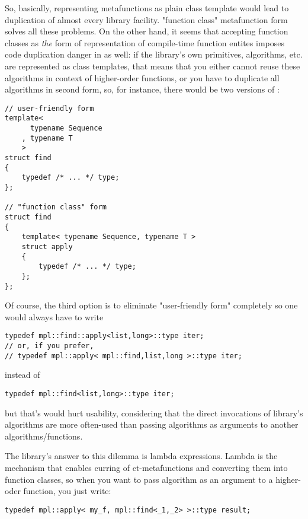 \documentclass{netobjectdays}
\begin{document}
So, basically, representing metafunctions as plain class 
template would lead to duplication of almost every library 
facility. "function class" metafunction form solves all these 
problems. On the other hand, it seems that accepting function 
classes as \emph{the} form of representation of compile-time 
function entites imposes code duplication danger in as well: 
if the library's own primitives, algorithms, etc. are 
represented as class templates, that means that you either 
cannot reuse these algorithms in context of higher-order 
functions, or you have to duplicate all algorithms in second 
form, so, for instance, there would be two versions of 
:

{\footnotesize
\begin{verbatim}
// user-friendly form
template<
      typename Sequence
    , typename T
    >
struct find
{
    typedef /* ... */ type;
};

// "function class" form
struct find
{
    template< typename Sequence, typename T >
    struct apply
    {
        typedef /* ... */ type;
    };
};
\end{verbatim}
}

Of course, the third option is to eliminate 
"user-friendly form" completely so one would always 
have to write

{\footnotesize
\begin{verbatim}
typedef mpl::find::apply<list,long>::type iter;
// or, if you prefer,
// typedef mpl::apply< mpl::find,list,long >::type iter;
\end{verbatim}
}

instead of 

{\footnotesize
\begin{verbatim}
typedef mpl::find<list,long>::type iter;
\end{verbatim}
}

but that's would hurt usability, considering that the direct 
invocations of library's algorithms are more often-used than 
passing algorithms as arguments to another 
algorithms/functions. 

The library's answer to this dilemma is lambda expressions. 
Lambda is the mechanism that enables curring of 
ct-metafunctions and converting them into function classes, 
so when you want to pass  algorithm as an argument 
to a higher-oder function, you just write:

{\footnotesize
\begin{verbatim}
typedef mpl::apply< my_f, mpl::find<_1,_2> >::type result;
\end{verbatim}
}
\end{document}
